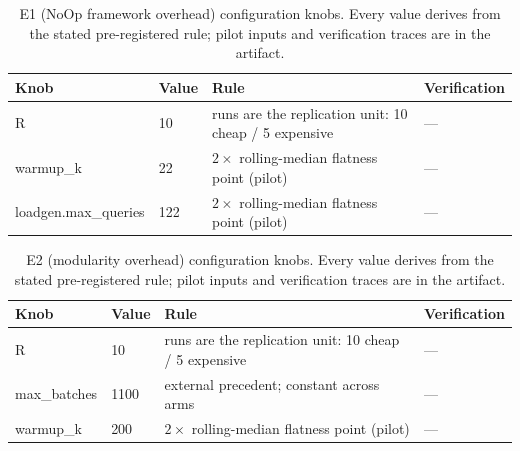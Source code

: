 
\begin{table}[t]\centering\small
\caption{E1 (NoOp framework overhead) configuration knobs. Every value derives from the stated pre-registered rule; pilot inputs and verification traces are in the artifact.}
\label{tab:knobs-e1}
\begin{tabular}{llll}
\toprule
Knob & Value & Rule & Verification \\
\midrule
R & 10 & runs are the replication unit: 10 cheap / 5 expensive & --- \\
warmup\_k & 22 & $2\times$ rolling-median flatness point (pilot) & --- \\
loadgen.max\_queries & 122 & $2\times$ rolling-median flatness point (pilot) & --- \\
\bottomrule
\end{tabular}
\end{table}

\begin{table}[t]\centering\small
\caption{E2 (modularity overhead) configuration knobs. Every value derives from the stated pre-registered rule; pilot inputs and verification traces are in the artifact.}
\label{tab:knobs-e2}
\begin{tabular}{llll}
\toprule
Knob & Value & Rule & Verification \\
\midrule
R & 10 & runs are the replication unit: 10 cheap / 5 expensive & --- \\
max\_batches & 1100 & external precedent; constant across arms & --- \\
warmup\_k & 200 & $2\times$ rolling-median flatness point (pilot) & --- \\
\bottomrule
\end{tabular}
\end{table}

